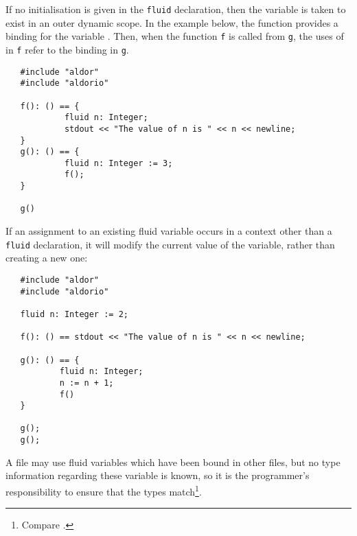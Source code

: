 If no initialisation is given in the \verb"fluid" declaration, then
the variable is taken to exist in an outer dynamic scope.
In the example below,
the function  provides a binding for the variable .
Then, when the function {\tt f} is called from {\tt g},
the uses of  in {\tt f} refer to the binding in {\tt g}.

\begin{small}
\begin{verbatim}
   #include "aldor"
   #include "aldorio"

   f(): () == {
            fluid n: Integer;
            stdout << "The value of n is " << n << newline;
   }
   g(): () == {
            fluid n: Integer := 3;
            f();
   }

   g()
\end{verbatim}
\end{small}

If an assignment to an existing fluid variable occurs in a context
other than a {\tt fluid} declaration, it will modify the current
value of the variable, rather than creating a new one:

\begin{small}
\begin{verbatim}
   #include "aldor"
   #include "aldorio"

   fluid n: Integer := 2;

   f(): () == stdout << "The value of n is " << n << newline;

   g(): () == {
           fluid n: Integer;
           n := n + 1;
           f()
   }

   g();
   g();
\end{verbatim}
\end{small}



A file may use fluid variables which have been bound in other files, but
no type information regarding these variable is known, so it is
the programmer's responsibility to ensure that the types
match\footnote{Compare .}.

